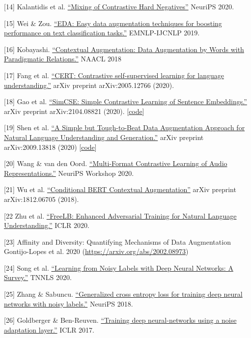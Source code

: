 {[}14{]} Kalantidis et al. \href{https://arxiv.org/abs/2010.01028}{``Mixing of Contrastive Hard Negatives''} NeuriPS 2020.

{[}15{]} Wei \& Zou. \href{https://arxiv.org/abs/1901.11196}{``EDA: Easy data augmentation techniques for boosting performance on text classification tasks.''} EMNLP-IJCNLP 2019.

{[}16{]} Kobayashi. \href{https://arxiv.org/abs/1805.06201}{``Contextual Augmentation: Data Augmentation by Words with Paradigmatic Relations.''} NAACL 2018

{[}17{]} Fang et al. \href{https://arxiv.org/abs/2005.12766}{``CERT: Contrastive self-supervised learning for language understanding.''} arXiv preprint arXiv:2005.12766 (2020).

{[}18{]} Gao et al. \href{https://arxiv.org/abs/2104.08821}{``SimCSE: Simple Contrastive Learning of Sentence Embeddings.''} arXiv preprint arXiv:2104.08821 (2020). {[}\href{https://github.com/princeton-nlp/SimCSE}{code}{]}

{[}19{]} Shen et al. \href{https://arxiv.org/abs/2009.13818}{``A Simple but Tough-to-Beat Data Augmentation Approach for Natural Language Understanding and Generation.''} arXiv preprint arXiv:2009.13818 (2020) {[}\href{https://github.com/dinghanshen/cutoff}{code}{]}

{[}20{]} Wang \& van den Oord. \href{https://arxiv.org/abs/2103.06508}{``Multi-Format Contrastive Learning of Audio Representations.''} NeuriPS Workshop 2020.

{[}21{]} Wu et al. \href{https://arxiv.org/abs/1812.06705}{``Conditional BERT Contextual Augmentation''} arXiv preprint arXiv:1812.06705 (2018).

{[}22 Zhu et al. \href{https://arxiv.org/abs/1909.11764}{``FreeLB: Enhanced Adversarial Training for Natural Language Understanding.''} ICLR 2020.

{[}23{]} Affinity and Diversity: Quantifying Mechanisms of Data Augmentation Gontijo-Lopes et al. 2020 (\url{https://arxiv.org/abs/2002.08973})

{[}24{]} Song et al. \href{https://arxiv.org/abs/2007.08199}{``Learning from Noisy Labels with Deep Neural Networks: A Survey.''} TNNLS 2020.

{[}25{]} Zhang \& Sabuncu. \href{https://arxiv.org/abs/1805.07836}{``Generalized cross entropy loss for training deep neural networks with noisy labels.''} NeuriPS 2018.

{[}26{]} Goldberger \& Ben-Reuven. \href{https://openreview.net/forum?id=H12GRgcxg}{``Training deep neural-networks using a noise adaptation layer.''} ICLR 2017.

